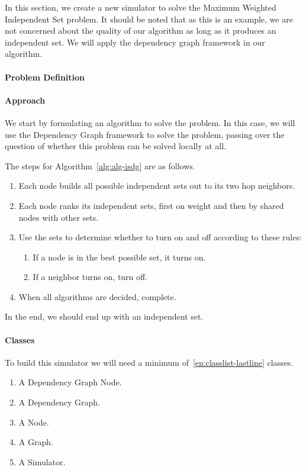 
\label{sec:sim-new}

In this section, we create a new simulator to solve the Maximum Weighted Independent Set problem. It should be noted that as this is an example, we are not concerned about the quality of our algorithm as long as it produces an independent set. We will apply the dependency graph framework in our algorithm.

\paragraph{Problem Definition}


\paragraph{Approach}

We start by formulating an algorithm to solve the problem. In this case, we will use the Dependency Graph framework to solve the problem, passing over the question of whether this problem can be solved locally at all.

The steps for Algorithm~\ref{alg:alg-isdg} are as follows.

\begin{enumerate}
\item Each node builds all possible independent sets out to its two hop neighbors.
\item Each node ranks its independent sets, first on weight and then by shared nodes with other sets.
\item Use the sets to determine whether to turn on and off according to these rules:
\begin{enumerate}
\item If a node is in the best possible set, it turns on.
\item If a neighbor turns on, turn off.
\end{enumerate}
\item When all algorithms are decided, complete.
\end{enumerate}

In the end, we should end up with an independent set.

\paragraph{Classes}

To build this simulator we will need a minimum of~\ref{en:classlist-lastline} classes.
\begin{enumerate}
\item A Dependency Graph Node.
\item A Dependency Graph.
\item A Node.
\item A Graph.
\item A Simulator.\label{en:classlist-lastline}
\end{enumerate}

